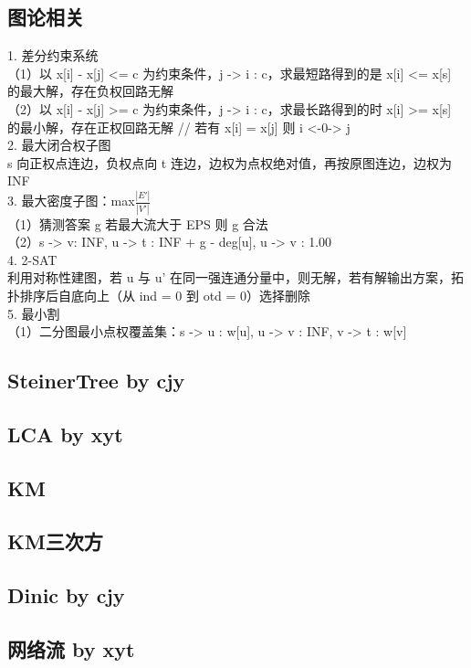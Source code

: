 \documentclass[11pt]{article}
\begin{document}
		\subsection{图论相关}
		
		1. 差分约束系统\\
  （1）以 x[i] - x[j] <= c 为约束条件，j -> i : c，求最短路得到的是 x[i] <= x[s] 的最大解，存在负权回路无解\\
  （2）以 x[i] - x[j] >= c 为约束条件，j -> i : c，求最长路得到的时 x[i] >= x[s] 的最小解，存在正权回路无解
  // 若有 x[i] = x[j] 则 i <-0-> j\\
2. 最大闭合权子图\\
  s 向正权点连边，负权点向 t 连边，边权为点权绝对值，再按原图连边，边权为INF\\
3. 最大密度子图：max{$\frac{|E'|}{|V'|}$}\\
  （1）猜测答案 g 若最大流大于 EPS 则 g 合法\\
  （2）s -> v: INF, u -> t : INF + g - deg[u], u -> v : 1.00\\
4. 2-SAT\\
  利用对称性建图，若 u 与 u' 在同一强连通分量中，则无解，若有解输出方案，拓扑排序后自底向上（从 ind = 0 到 otd = 0）选择删除\\
5. 最小割\\
  （1）二分图最小点权覆盖集：s -> u : w[u], u -> v : INF, v -> t : w[v]\\
		\subsection{SteinerTree by cjy}
		
		\subsection{LCA by xyt}
		
		\subsection{KM}
		
		\subsection{KM三次方}
		
		\subsection{Dinic by cjy}
		
		\subsection{网络流 by xyt}
		
\end{document}
